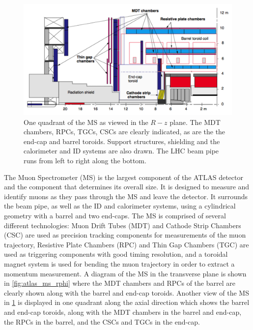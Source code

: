 \begin{figure}[ht]
\centering
\includegraphics[width=.95\textwidth]{figures/atlas/ms_rz}
\caption{One quadrant of the MS as viewed in the $R-z$ plane. The
MDT chambers, RPCs, TGCs, CSCs are clearly indicated, as are the 
the end-cap and barrel toroids. Support structures, shielding and the calorimeter
and ID systems are also drawn. The LHC beam pipe runs from left to right
along the bottom.}
\label{fig:atlas_ms_rz}
\end{figure}

The Muon Spectrometer (MS) is the largest component of the ATLAS
detector and the component that determines its overall size. 
It is designed to measure and identify muons as they
pass through the MS and leave the detector.
It surrounds the beam pipe, as well as the ID and calorimeter systems,
using a cylindrical geometry with a barrel and two end-caps. 
The MS is comprised of several different technologies:
Muon Drift Tubes (MDT) and Cathode Strip Chambers (CSC) are used as
precision tracking components for measurements of the muon 
trajectory, Resistive Plate Chambers (RPC) and 
Thin Gap Chambers (TGC) are used as triggering 
components with good timing resolution, 
and a toroidal magnet system is used for bending the muon trajectory 
in order to extract a momentum measurement.
A diagram of the MS in the transverse plane is shown in 
\fig\ref{fig:atlas_ms_rphi} where the MDT chambers and RPCs of the barrel
are clearly shown along with the barrel and end-cap toroids.
Another view of the MS in \fig\ref{fig:atlas_ms_rz} is displayed in
one quadrant along the axial direction which
shows the barrel and end-cap toroids, along with 
the MDT chambers in the barrel and end-cap, the RPCs in the
barrel, and the CSCs and TGCs in the end-cap.

